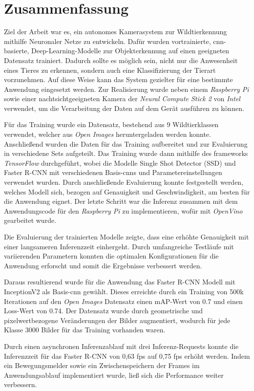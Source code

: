 \chapter{Zusammenfassung}\label{kap:zusammenfassungausblick}


Ziel der Arbeit war es, ein autonomes
Kamerasystem zur Wildtierkennung
mithilfe Neuronaler Netze zu entwickeln.
Dafür wurden vortrainierte, \Gls{cnn}-basierte, 
Deep-Learning-Modelle zur Objekterkennung
auf einen geeigneten Datensatz trainiert.
Dadurch sollte es möglich sein, nicht 
nur die Anwesenheit eines Tieres 
zu erkennen, sondern auch eine 
Klassifizierung der Tierart 
vorzunehmen. Auf diese Weise kann das System 
gezielter für eine bestimmte
Anwendung eingesetzt werden.
Zur Realisierung wurde neben einem \textit{Raspberry
Pi} sowie einer nachtsichtgeeigneten 
Kamera der \textit{Neural Compute Stick 2}
von \textit{Intel} verwendet, um die 
Verarbeitung der Daten auf dem 
Gerät ausführen zu können.
\vspace{0.5cm}


Für das Training wurde ein Datensatz, 
bestehend aus 9 Wildtierklassen verwendet,
welcher aus \textit{Open Images} heruntergeladen werden konnte.
Anschließend wurden die Daten 
für das Training aufbereitet und
zur Evaluierung in verschiedene 
Sets aufgeteilt.
Das Training wurde dann mithilfe des 
\Glspl{framework} \textit{TensorFlow} durchgeführt,
wobei die Modelle Single Shot Detector (SSD) und
Faster R-CNN mit verschiedenen
Basis-\Glspl{cnn} und Parametereinstellungen
verwendet wurden.
Durch anschließende Evaluierung konnte 
festgestellt werden, welches Modell sich,
bezogen auf Genauigkeit und Geschwindigkeit,
am besten für die Anwendung eignet.
Der letzte Schritt war die Inferenz zusammen 
mit dem Anwendungscode für den \textit{Raspberry Pi} 
zu implementieren, wofür mit \textit{OpenVino} gearbeitet 
wurde.
\vspace{0.5cm}

Die Evaluierung der trainierten Modelle zeigte,
dass eine erhöhte Genauigkeit mit einer 
langsameren Inferenzzeit einhergeht.
Durch umfangreiche Testläufe mit 
variierenden Parametern konnten die 
optimalen Konfigurationen für die Anwendung 
erforscht und somit die Ergebnisse verbessert 
werden.

Daraus resultierend wurde für die Anwendung das 
Faster R-CNN Modell mit InceptionV2 
als Basis-\Gls{cnn} gewählt. Dieses erreichte 
durch ein Training von 500k Iterationen 
auf den \textit{Open Images} Datensatz 
einen mAP-Wert von 0.7 und einen Loss-Wert von 0.74.
Der Datensatz wurde durch geometrische und 
pixelwertbezogene Veränderungen der Bilder 
augmentiert, wodurch für jede Klasse 3000 
Bilder für das Training vorhanden waren.

Durch einen asynchronen Inferenzablauf 
mit drei Inferenz-Requests konnte die 
Inferenzzeit für das Faster R-CNN 
von 0,63 \Gls{fps} auf 0,75 \Gls{fps} 
erhöht werden. 
Indem ein Bewegungsmelder sowie ein 
Zwischenspeichern der Frames im 
Anwendungsablauf implementiert wurde, ließ sich 
die Performance weiter verbessern.
